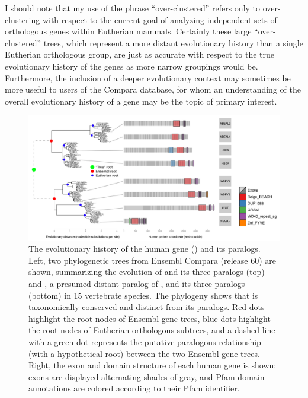 I should note that my use of the phrase ``over-clustered'' refers only
to over-clustering with respect to the current goal of analyzing
independent sets of orthologous genes within Eutherian
mammals. Certainly these large ``over-clustered'' trees, which
represent a more distant evolutionary history than a single Eutherian
orthologous group, are just as accurate with respect to the true
evolutionary history of the genes as more narrow groupings would
be. Furthermore, the inclusion of a deeper evolutionary context may
sometimes be more useful to users of the Compara database, for whom an
understanding of the overall evolutionary history of a gene may be the
topic of primary interest.

\begin{figure}[h]
\centering
\includegraphics[scale=0.3]{Figs/nbeal2_full.pdf}
\caption{The evolutionary history of the human 
  gene () and its paralogs. Left, two phylogenetic trees from
  Ensembl Compara (release 60) are shown, summarizing the evolution of
   and its three paralogs (top) and , a presumed distant
  paralog of , and its three paralogs (bottom) in 15
  vertebrate species. The phylogeny shows that  is
  taxonomically conserved and distinct from its paralogs. Red dots
  highlight the root nodes of Ensembl gene trees, blue dots highlight
  the root nodes of Eutherian orthologous subtrees, and a dashed line
  with a green dot represents the putative paralogous relationship
  (with a hypothetical root) between the two Ensembl gene
  trees. Right, the exon and domain structure of each human gene is
  shown: exons are displayed alternating shades of gray, and Pfam
  domain annotations are colored according to their Pfam identifier.}
\label{nbeal2}
\end{figure}

